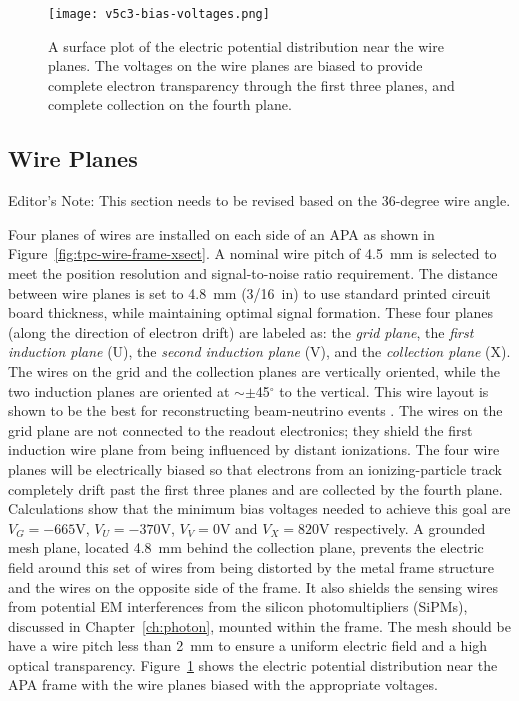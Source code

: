 \begin{figure}[htbp]
\centering
\texttt{[image: v5c3-bias-voltages.png]}
\caption[Plot of electric potential distribution near the wire planes]{A surface plot of the electric potential distribution near the wire planes.  The voltages on the wire planes are biased to provide complete electron transparency through the first three planes, and complete collection on the fourth plane. }
\label{fig:tpc-bias-voltages}
\end{figure}

\subsection{Wire Planes}

\begin{editornote}
Editor's Note: This section needs to be revised based on the 36-degree wire angle.  
\end{editornote}

Four planes of wires are installed on each side of an APA as shown in Figure~\ref{fig:tpc-wire-frame-xsect}.
A nominal wire pitch of 4.5~mm is selected to meet the position resolution  and signal-to-noise ratio requirement. The distance between wire planes is set to 4.8~mm (3/16~in) to use standard printed circuit board thickness, while maintaining optimal signal formation.  These four planes (along the direction of electron drift) are labeled as: the {\em grid plane}, the {\em first induction plane} (U), the {\em second induction plane} (V), and the {\em collection plane} (X).
The wires on the grid and the collection planes
are vertically oriented, while the two induction planes are oriented 
at $\sim\pm$45$^\circ$ to the vertical. This wire layout is shown to be the best for reconstructing beam-neutrino events \cite{wire-orientation}. The wires on the grid plane are not 
connected to the readout electronics; they shield the first induction wire plane from being influenced by distant ionizations. The four wire planes 
will be electrically biased so that electrons from an ionizing-particle
track completely drift past the first three planes and are collected by the 
fourth plane. Calculations show that the minimum bias voltages 
needed to achieve this goal are $V_G= -665$V, $V_U=-370$V, $V_V=0$V and $V_X=820$V 
respectively.  A grounded mesh plane, located 4.8~mm behind the collection plane, prevents the electric field around this set of wires from being distorted by the metal frame structure and the wires on the opposite side of the frame. It also shields the sensing wires from potential EM interferences from the silicon photomultipliers (SiPMs), discussed in Chapter~\ref{ch:photon}, mounted within the frame.  The mesh should be have a wire pitch less than 2~mm to ensure a uniform electric field and a high optical transparency.  Figure~\ref{fig:tpc-bias-voltages} shows the electric potential distribution near the APA frame with the wire planes biased with the appropriate voltages. 

